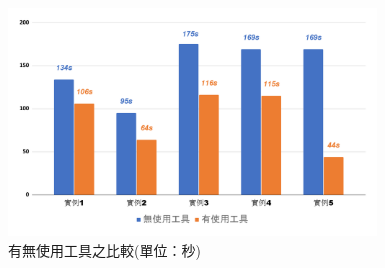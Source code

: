 
\begin{figure}[H]
    \centering
    \setlength{\abovecaptionskip}{-15pt}
    \setlength{\belowcaptionskip}{0pt}
    \includegraphics[width=0.87\textwidth]{picture/experiment/ch4-all_compare.png}
    \caption{有無使用工具之比較(單位：秒)}
    \label{f4.9}
\end{figure}


